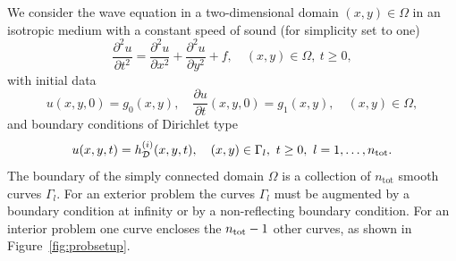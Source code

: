 \documentclass[11pt]{article}
\newcommand{\fig}[1]{\mbox{Figure{~#1}}}
\newcommand{\be}{\begin{equation}}
\newcommand{\ee}{\end{equation}}
\newcommand{\pa}{\partial}
\newcommand{\f}{\frac}
\begin{document}
We consider the wave equation in a two-dimensional domain $(x,y)\in\Omega$ in an isotropic medium
with a constant speed of sound (for simplicity set to one) 
%
\be \label{eq:weq} 
\f{\pa^2 u}{\pa t^2} =
\f{\pa^2 u}{\pa x^2} + \f{\pa^2 u}{\pa y^2} + f,\quad (x,y)\in\Omega,\ t\geq 0,
\ee 
%
with initial data 
%
\be \label{eq:weqid1} 
u(x,y,0) = g_0(x,y), \quad \f{\pa u}{\pa t}(x,y,0) = g_1(x,y), \quad (x,y)\in\Omega,
\ee 
%
and boundary conditions of Dirichlet type
%
\be
\label{eq:weqbcD} u(x,y,t) = h^{(i)}_{\mathcal{D}}(x,y,t),\quad (x,y)\in \Gamma_l, \ t\geq 0,\ l=1,\ldots, n_{\rm tot}. 
\ee 
The boundary of the simply connected domain $\Omega$ is a collection of $n_{\text{tot}}$ smooth
curves $\Gamma_l$. For an exterior problem the curves $\Gamma_l$ must be augmented by a boundary condition at
infinity or by a non-reflecting boundary condition. For an interior problem one curve encloses the
$n_{\rm tot}-1$ other curves, as shown in \fig{\ref{fig:probsetup}}.
\end{document}
